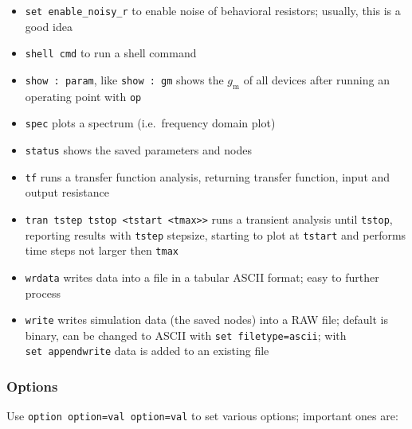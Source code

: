 \documentclass[
  a4paper,
  DIV=11,
  numbers=noendperiod]{scrartcl}
\begin{document}
\begin{itemize}
\item
  \texttt{set\ enable\_noisy\_r} to enable noise of behavioral
  resistors; usually, this is a good idea
\item
  \texttt{shell\ cmd} to run a shell command
\item
  \texttt{show\ :\ param}, like \texttt{show\ :\ gm} shows the
  \(g_\mathrm{m}\) of all devices after running an operating point with
  \texttt{op}
\item
  \texttt{spec} plots a spectrum (i.e.~frequency domain plot)
\item
  \texttt{status} shows the saved parameters and nodes
\item
  \texttt{tf} runs a transfer function analysis, returning transfer
  function, input and output resistance
\item
  \texttt{tran\ tstep\ tstop\ \textless{}tstart\ \textless{}tmax\textgreater{}\textgreater{}}
  runs a transient analysis until \texttt{tstop}, reporting results with
  \texttt{tstep} stepsize, starting to plot at \texttt{tstart} and
  performs time steps not larger then \texttt{tmax}
\item
  \texttt{wrdata} writes data into a file in a tabular ASCII format;
  easy to further process
\item
  \texttt{write} writes simulation data (the saved nodes) into a RAW
  file; default is binary, can be changed to ASCII with
  \texttt{set\ filetype=ascii}; with \texttt{set\ appendwrite} data is
  added to an existing file
\end{itemize}

\subsubsection{Options}\label{options}

Use \texttt{option\ option=val\ option=val} to set various options;
important ones are:
\end{document}
